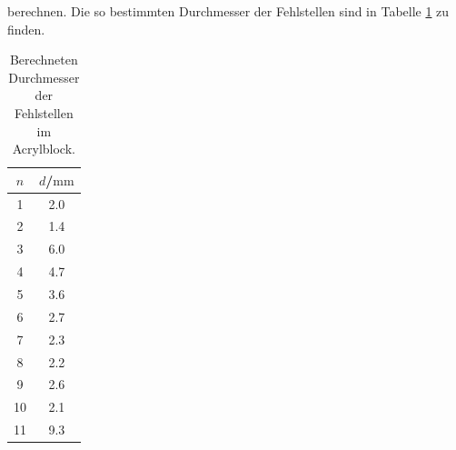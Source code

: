 berechnen.
Die so bestimmten Durchmesser der Fehlstellen sind in Tabelle \ref{tab:durchfehl} zu finden.
\begin{table}
  \centering
	\caption{Berechneten Durchmesser der Fehlstellen im Acrylblock.}
	\label{tab:durchfehl}
	\begin{tabular}{cc}
		\toprule
		$n$ & $d$/$\si{\milli\meter}$ \\
		\midrule
		1 & 2.0 \\
		2 & 1.4 \\
		3 & 6.0 \\
		4 & 4.7 \\
		5 & 3.6 \\
		6 & 2.7 \\
		7 & 2.3 \\
		8 & 2.2 \\
		9 & 2.6 \\
		10 & 2.1 \\
		11 & 9.3 \\
		\bottomrule
	\end{tabular}
\end{table}

\FloatBarrier
